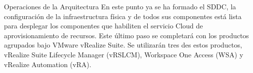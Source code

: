 \begin{subsection}{Operaciones de la Arquitectura}
    En este punto ya se ha formado el SDDC, la configuración de la infraestructura física y de todos sus componentes está lista para desplegar los componentes que habiliten el servicio Cloud de aprovisionamiento de recursos. Este último paso se completará con los productos agrupados bajo VMware vRealize Suite. Se utilizarán tres des estos productos, vRealize Suite Lifecycle Manager (vRSLCM), Workspace One Access (WSA) y vRealize Automation (vRA).
    

\end{subsection}
